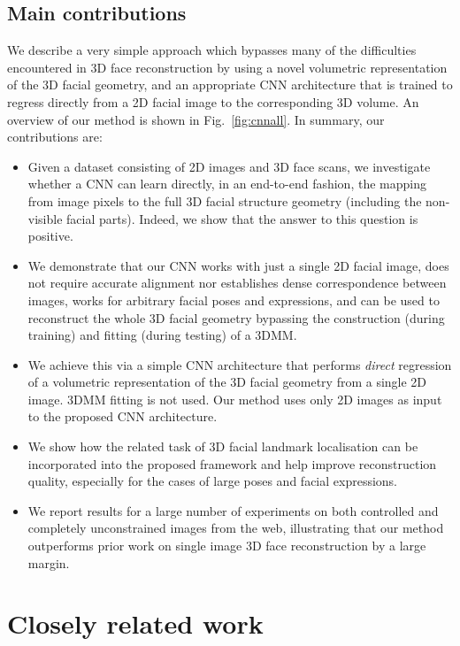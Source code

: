 \subsection{Main contributions}
We describe a very simple approach which bypasses many of the
difficulties encountered in 3D face reconstruction by using a
novel volumetric representation of the 3D facial geometry, and
an appropriate CNN architecture that is trained to regress directly
from a 2D facial image to the corresponding 3D volume. An overview of
our method is shown in Fig.~\ref{fig:cnnall}. In summary, our contributions
are:
\begin{itemize}
\item Given a dataset consisting of 2D images and 3D face scans, we
  investigate whether a CNN can learn directly, in an end-to-end fashion, the
  mapping from image pixels to the full 3D facial structure geometry
  (including the non-visible facial parts). Indeed, we show that the
  answer to this question is positive.
\item We demonstrate that our CNN works with just a single 2D facial
  image, does not require accurate alignment nor establishes dense
  correspondence between images, works for arbitrary facial poses and
  expressions, and can be used to reconstruct the whole 3D facial
  geometry bypassing the construction (during training) and fitting
  (during testing) of a 3DMM.
\item We achieve this via a simple CNN architecture that performs
  \textit{direct} regression of a volumetric representation of the 3D
  facial geometry from a single 2D image. 3DMM fitting is not
  used. Our method uses only 2D images as input to the proposed CNN
  architecture.
\item We show how the related task of 3D facial landmark localisation
  can be incorporated into the proposed framework and help improve
  reconstruction quality, especially for the cases of large poses and
  facial expressions.
\item We report results for a large number of experiments on both
  controlled and completely unconstrained images from the web,
  illustrating that our method outperforms prior work on single image
  3D face reconstruction by a large margin.
\end{itemize}


\section{Closely related work}


